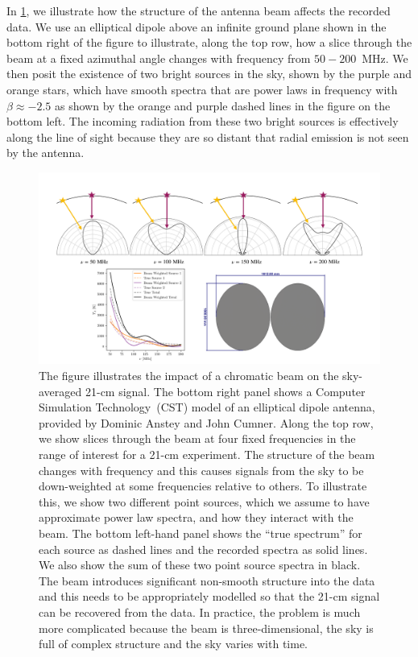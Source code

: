 In \cref{fig:chromaticity}, we illustrate how the structure of the antenna beam affects the recorded data. We use an elliptical dipole above an infinite ground plane shown in the bottom right of the figure to illustrate, along the top row, how a slice through the beam at a fixed azimuthal angle changes with frequency from $50 - 200$~MHz. We then posit the existence of two bright sources in the sky, shown by the purple and orange stars, which have smooth spectra that are power laws in frequency with $\beta \approx -2.5$ as shown by the orange and purple dashed lines in the figure on the bottom left. The incoming radiation from these two bright sources is effectively along the line of sight because they are so distant that radial emission is not seen by the antenna.

\begin{figure}
    \centering
    \includegraphics[width=\linewidth]{introduction/figs/chromaticity.pdf}
    \caption{The figure illustrates the impact of a chromatic beam on the sky-averaged 21-cm signal. The bottom right panel shows a Computer Simulation Technology~(CST) model of an elliptical dipole antenna, provided by Dominic Anstey and John Cumner. Along the top row, we show slices through the beam at four fixed frequencies in the range of interest for a 21-cm experiment. The structure of the beam changes with frequency and this causes signals from the sky to be down-weighted at some frequencies relative to others. To illustrate this, we show two different point sources, which we assume to have approximate power law spectra, and how they interact with the beam. The bottom left-hand panel shows the ``true spectrum'' for each source as dashed lines and the recorded spectra as solid lines. We also show the sum of these two point source spectra in black. The beam introduces significant non-smooth structure into the data and this needs to be appropriately modelled so that the 21-cm signal can be recovered from the data. In practice, the problem is much more complicated because the beam is three-dimensional, the sky is full of complex structure and the sky varies with time.}
    \label{fig:chromaticity}
\end{figure}

